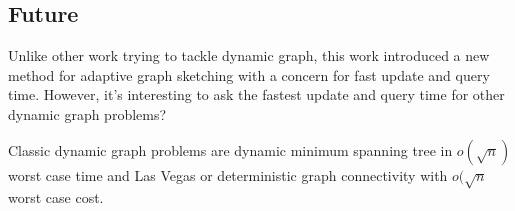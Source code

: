 \documentclass[conference,compsoc]{IEEEtran}
\begin{document}
	\subsection{Future}
		\par Unlike other work trying to tackle dynamic graph, this work introduced a new method for adaptive graph sketching with a concern for fast update and query time. 
		However, it's interesting to ask the fastest update and query time for other dynamic graph problems?
		\par Classic dynamic graph problems are dynamic minimum spanning tree in $o(\sqrt{n})$ worst case time and Las Vegas or deterministic graph connectivity with $o(\sqrt{n}$ worst case cost.



\end{document}
